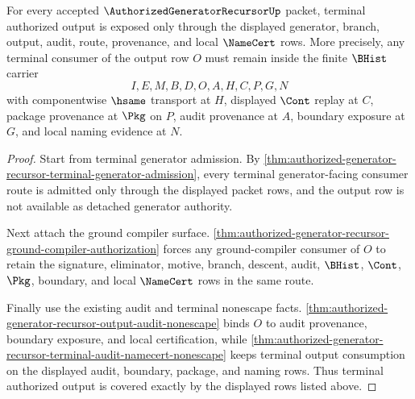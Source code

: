 \begin{theorem}
\label{thm:authorized-generator-recursor-terminal-authorized-output-cover}
For every accepted $\AuthorizedGeneratorRecursorUp$ packet, terminal authorized output is exposed only through the displayed generator, branch, output, audit, route, provenance, and local $\NameCert$ rows. More precisely, any terminal consumer of the output row $O$ must remain inside the finite $\BHist$ carrier
$$
I,E,M,B,D,O,A,H,C,P,G,N
$$
with componentwise $\hsame$ transport at $H$, displayed $\Cont$ replay at $C$, package provenance at $\Pkg$ on $P$, audit provenance at $A$, boundary exposure at $G$, and local naming evidence at $N$.
\end{theorem}
\begin{proof}
Start from terminal generator admission. By \autoref{thm:authorized-generator-recursor-terminal-generator-admission}, every terminal generator-facing consumer route is admitted only through the displayed packet rows, and the output row is not available as detached generator authority.

Next attach the ground compiler surface. \autoref{thm:authorized-generator-recursor-ground-compiler-authorization} forces any ground-compiler consumer of $O$ to retain the signature, eliminator, motive, branch, descent, audit, $\BHist$, $\Cont$, $\Pkg$, boundary, and local $\NameCert$ rows in the same route.

Finally use the existing audit and terminal nonescape facts. \autoref{thm:authorized-generator-recursor-output-audit-nonescape} binds $O$ to audit provenance, boundary exposure, and local certification, while \autoref{thm:authorized-generator-recursor-terminal-audit-namecert-nonescape} keeps terminal output consumption on the displayed audit, boundary, package, and naming rows. Thus terminal authorized output is covered exactly by the displayed rows listed above.
\end{proof}

